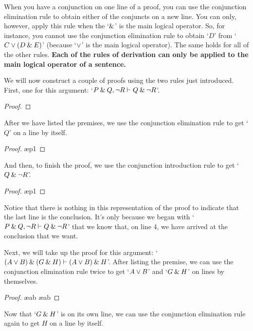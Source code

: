 When you have a conjunction on one line of a proof, you can use the conjunction elimination rule to obtain either of the conjuncts on a new line. You can only, however, apply this rule when the `$\mathbin{\&}$' is the main logical operator. So, for instance, you cannot use the conjunction elimination rule to obtain `$D$' from `$C \vee (D \mathbin{\&} E)$' (because `$\vee$' is the main logical operator). The same holds for all of the other rules. \textbf{Each of the rules of derivation can only be applied to the main logical operator of a sentence.}
\bigskip

\noindent We will now construct a couple of proofs using the two rules just introduced.  First, one for this argument: `$P \mathbin{\&} Q, {\neg} R \vdash Q \mathbin{\&} {\neg} R$'.

\begin{proof}
	 \pr{}
	 \pr{}
\end{proof}\medskip

\noindent After we have listed the premises, we use the conjunction elimination rule to get `$Q$' on a line by itself.

\begin{proof}
	 \pr{}
	 \pr{}
	 \ae{p1}
\end{proof}\medskip

\noindent And then, to finish the proof, we use the conjunction introduction rule to get `$Q \mathbin{\&} {\neg} R$'.

\begin{proof}
	 \pr{}
	 \pr{}
	 \ae{p1}
	 
\end{proof}\medskip
Notice that there is nothing in this representation of the proof to indicate that the last line is the conclusion. It's only because we began with `$P \mathbin{\&} Q, {\neg} R \vdash Q \mathbin{\&} {\neg} R$' that we know that, on line 4, we have arrived at the conclusion that we want.

Next, we will take up the proof for this argument: `$(A\vee B) \mathbin{\&} (G \mathbin{\&} H) \vdash (A\vee B)\mathbin{\&} H$'. After listing the premise, we can use the conjunction elimination rule twice to get `$A\vee B$' and `$G\mathbin{\&} H$' on lines by themselves.
\begin{proof}
	 \pr{}
	 \ae{ab}
	 \ae{ab}
\end{proof}

\noindent Now that `$G\mathbin{\&} H$' is on its own line, we can use the conjunction elimination rule again to get $H$ on a line by itself. 

